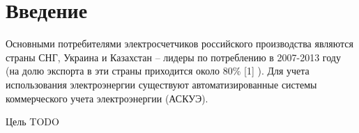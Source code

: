 \newpage

\section{Введение}
\setcounter{figure}{0}

Основными  потребителями  электросчетчиков российского производства являются страны СНГ, Украина и Казахстан – лидеры по потреблению в 2007-2013 году (на долю экспорта в эти страны приходится около  80\% [1] ). Для учета использования электроэнергии существуют автоматизированные системы коммерческого учета электроэнергии (АСКУЭ).

Цель TODO%

